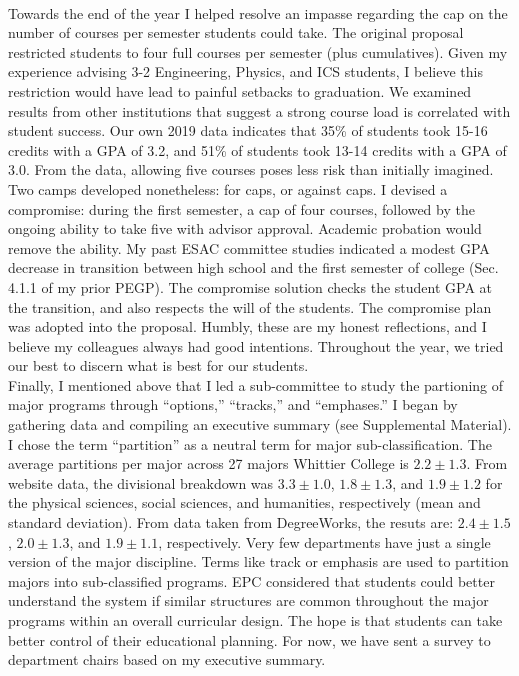 \documentclass[../../../main.tex]{subfiles}
\begin{document}
\\
\vspace{0.15cm}
Towards the end of the year I helped resolve an impasse regarding the cap on the number of courses per semester students could take.  The original proposal restricted students to four full courses per semester (plus cumulatives).  Given my experience advising 3-2 Engineering, Physics, and ICS students, I believe this restriction would have lead to painful setbacks to graduation.  We examined results from other institutions that suggest a strong course load is correlated with student success.  Our own 2019 data indicates that 35\% of students took 15-16 credits with a GPA of 3.2, and 51\% of students took 13-14 credits with a GPA of 3.0.  From the data, allowing five courses poses less risk than initially imagined.  Two camps developed nonetheless: for caps, or against caps.  I devised a compromise: during the first semester, a cap of four courses, followed by the ongoing ability to take five with advisor approval.  Academic probation would remove the ability.  My past ESAC committee studies indicated a modest GPA decrease in transition between high school and the first semester of college (Sec. 4.1.1 of my prior PEGP).  The compromise solution checks the student GPA at the transition, and also respects the will of the students.  The compromise plan was adopted into the proposal.  Humbly, these are my honest reflections, and I believe my colleagues always had good intentions.  Throughout the year, we tried our best to discern what is best for our students.
\\
\vspace{0.15cm}
Finally, I mentioned above that I led a sub-committee to study the partioning of major programs through ``options,'' ``tracks,'' and ``emphases.''  I began by gathering data and compiling an executive summary (see Supplemental Material).  I chose the term ``partition'' as a neutral term for major sub-classification.  The average partitions per major across 27 majors Whittier College is $2.2 \pm 1.3$.  From website data, the divisional breakdown was $3.3 \pm 1.0$, $1.8 \pm 1.3$, and $1.9 \pm 1.2$ for the physical sciences, social sciences, and humanities, respectively (mean and standard deviation).  From data taken from DegreeWorks, the resuts are: $2.4 \pm 1.5$, $2.0 \pm 1.3$, and $1.9 \pm 1.1$, respectively.  Very few departments have just a single version of the major discipline.  Terms like track or emphasis are used to partition majors into sub-classified programs.  EPC considered that students could better understand the system if similar structures are common throughout the major programs within an overall curricular design.  The hope is that students can take better control of their educational planning.  For now, we have sent a survey to department chairs based on my executive summary.
\end{document}
